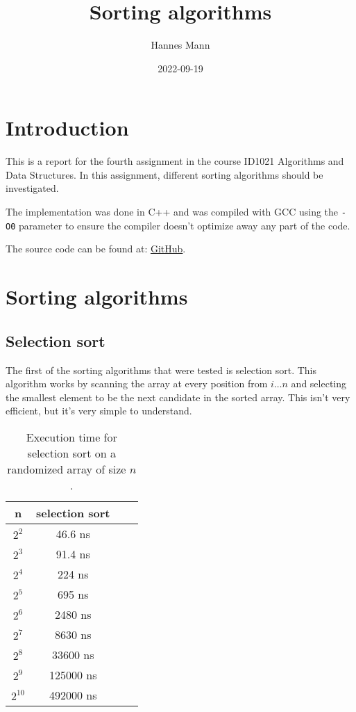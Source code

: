 \documentclass[a4paper,11pt]{article}
\begin{document}
\title{
    \textbf{Sorting algorithms}
}
\author{Hannes Mann}
\date{2022-09-19}

\maketitle

\section*{Introduction}

This is a report for the fourth assignment in the course ID1021 Algorithms and Data Structures. In this assignment, different sorting algorithms should be investigated.

The implementation was done in C++ and was compiled with GCC using the {\tt -O0} parameter to ensure the compiler doesn't optimize away any part of the code.

The source code can be found at: \href{https://github.com/HannesMann/ID1021/tree/main/src/calc}{GitHub}.

\section*{Sorting algorithms}

\subsection*{Selection sort}

The first of the sorting algorithms that were tested is selection sort. This algorithm works by scanning the array at every position from $i \dots n$ and selecting the smallest element to be the next candidate in the sorted array.
This isn't very efficient, but it's very simple to understand.

\begin{table}[H]
\centering
\begin{tabular}{|c|c|c|c|}
\hline
\textbf{n} & \textbf{selection sort} \\
\hline
	$2^{2}$ & 46.6 ns \\
	$2^{3}$ & 91.4 ns \\
	$2^{4}$ & 224 ns \\
	$2^{5}$ & 695 ns \\
	$2^{6}$ & 2480 ns \\
	$2^{7}$ & 8630 ns \\
	$2^{8}$ & 33600 ns \\
	$2^{9}$ & 125000 ns \\
	$2^{10}$ & 492000 ns \\
\hline
\end{tabular}
\caption{Execution time for selection sort on a randomized array of size $n$.}
\label{tab:table1}
\end{table}
\end{document}
